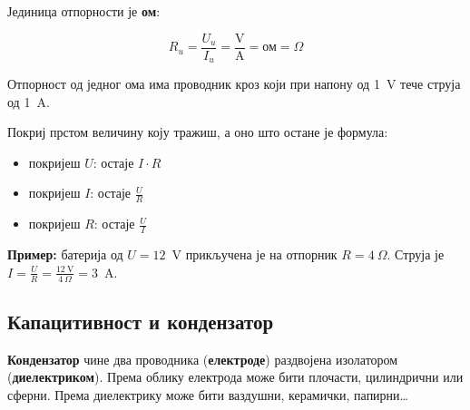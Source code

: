 \documentclass{article}
\begin{document}
Јединица отпорности је \textbf{ом}:

\begin{equation}
    R_u = \frac{U_u}{I_u} = \frac{\mathrm{V}}{\mathrm{A}} = \text{ом} = \Omega
\end{equation}

Отпорност од једног ома има проводник кроз који при напону од 1~V тече струја од 1~A.

\begin{tcolorbox}[colback=blue!5, colframe=blue!60, title=Омов троугао]
    \begin{minipage}{0.3\linewidth}
        \centering
    \end{minipage}
    \hfill
    \begin{minipage}{0.65\linewidth}
        Покриј прстом величину коју тражиш, а оно што остане је формула:
        \begin{itemize}
            \item покријеш $U$: остаје $I \cdot R$
            \item покријеш $I$: остаје $\frac{U}{R}$
            \item покријеш $R$: остаје $\frac{U}{I}$
        \end{itemize}
    \end{minipage}
\end{tcolorbox}

\textbf{Пример:} батерија од $U = 12$~V прикључена је на отпорник $R = 4~\Omega$. Струја је $I = \frac{U}{R} = \frac{12~\mathrm{V}}{4~\Omega} = 3$~A.

\subsection{Капацитивност и кондензатор}

\textbf{Кондензатор} чине два проводника (\textbf{електроде}) раздвојена изолатором (\textbf{диелектриком}). Према облику електрода може бити плочасти, цилиндрични или сферни. Према диелектрику може бити ваздушни, керамички, папирни\dots
\end{document}
